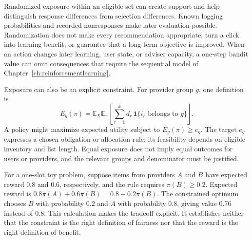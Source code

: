 \begin{center}
\begin{minipage}{\linewidth}
\centering
{}
\label{fig:recommendation-feedback}
\end{minipage}
\end{center}

Randomized exposure within an eligible set can create support and help distinguish response differences from selection differences. Known logging probabilities and recorded nonresponses make later evaluation possible. Randomization does not make every recommendation appropriate, turn a click into learning benefit, or guarantee that a long-term objective is improved. When an action changes later learning, user state, or adviser capacity, a one-step bandit value can omit consequences that require the sequential model of Chapter~\ref{ch:reinforcementlearning}.

Exposure can also be an explicit constraint. For provider group $g$, one definition is
\[
E_g(\pi)=\mathbb E_X\mathbb E_\pi\left[
\sum_{r=1}^k d_r\,\mathbf 1\{i_r\text{ belongs to }g\}\right].
\]
A policy might maximize expected utility subject to $E_g(\pi)\ge e_g$. The target $e_g$ expresses a chosen obligation or allocation rule; its feasibility depends on eligible inventory and list length. Equal exposure does not imply equal outcomes for users or providers, and the relevant groups and denominator must be justified.

For a one-slot toy problem, suppose items from providers $A$ and $B$ have expected reward $0.8$ and $0.6$, respectively, and the rule requires $\pi(B)\ge0.2$. Expected reward is $0.8\pi(A)+0.6\pi(B)=0.8-0.2\pi(B)$. The constrained optimum chooses $B$ with probability $0.2$ and $A$ with probability $0.8$, giving value $0.76$ instead of $0.8$. This calculation makes the tradeoff explicit. It establishes neither that the constraint is the right definition of fairness nor that the reward is the right definition of benefit.

